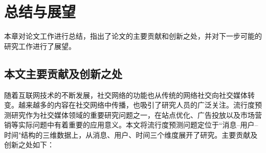 \chapter{总结与展望}
\label{chap:six}

本章对论文工作进行总结，指出了论文的主要贡献和创新之处，并对下一步可能的研究工作进行了展望。
\section{本文主要贡献及创新之处}
随着互联网技术的不断发展，社交网络的功能也从传统的网络社交向社交媒体转变。越来越多的内容在社交网络中传播，也吸引了研究人员的广泛关注。流行度预测研究作为社交媒体领域的重要研究问题之一，在站点优化、广告投放以及市场营销等实际问题中有着重要的应用意义。本文将流行度预测问题定位于``消息--用户--时间"结构的三维数据上，从消息、用户、时间三个维度展开了研究。主要贡献及创新之处如下：
